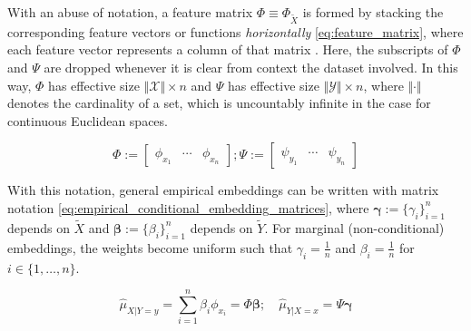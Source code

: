 \documentclass[twoside]{article} \usepackage{aistats2017}
\theoremstyle{definition}
\theoremstyle{theorem}
\newcommand{\rv}[1]{{#1}}
\newcommand{\ds}[1]{\tilde{#1}}
\newcommand{\hatmuYx}{\hat{\mu}_{\rv{Y} | \rv{X} = x}}
\newcommand{\hatmuXy}{\hat{\mu}_{\rv{X} | \rv{Y} = y}}
\newcommand{\cardX}{\Vert \mathcal{X} \Vert}
\newcommand{\cardY}{\Vert \mathcal{Y} \Vert}
\begin{document}
%			
%			
%			
			With an abuse of notation, a feature matrix $\Phi \equiv \Phi_{\ds{X}}$ is formed by stacking the corresponding feature vectors or functions \textit{horizontally} \eqref{eq:feature_matrix}, where each feature vector represents a column of that matrix  \citep{muandet2016kernel}. Here, the subscripts of $\Phi$ and $\Psi$ are dropped whenever it is clear from context the dataset involved. In this way, $\Phi$ has effective size $\cardX \times n$ and $\Psi$ has effective size $\cardY \times n$, where $\Vert \cdot \Vert$ denotes the cardinality of a set, which is uncountably infinite in the case for continuous Euclidean spaces.
				
			\begin{equation}
				\Phi := \begin{bmatrix} \phi_{x_{1}} & \cdots & \phi_{x_{n}} \end{bmatrix}; \Psi := \begin{bmatrix} \psi_{y_{1}} & \cdots & \psi_{y_{n}} \end{bmatrix}
			\label{eq:feature_matrix}
			\end{equation}
				

			With this notation, general empirical embeddings can be written with matrix notation \eqref{eq:empirical_conditional_embedding_matrices}, where $\bm{\gamma} := \{\gamma_{i}\}_{i = 1}^{n}$ depends on $\ds{X}$ and $\bm{\beta} := \{\beta_{i}\}_{i = 1}^{n}$ depends on $\ds{Y}$. For marginal (non-conditional) embeddings, the weights become uniform such that $\gamma_{i} = \frac{1}{n}$ and $\beta_{i} = \frac{1}{n}$ for $i \in \{1, \dots, n\}$.
			
			\begin{equation}
				\hatmuXy = \sum_{i = 1}^{n} \beta_{i} \phi_{x_{i}} = \Phi \bm{\beta} ;\quad \hatmuYx = \Psi \bm{\gamma}
			\label{eq:empirical_conditional_embedding_matrices}
			\end{equation}
		
\end{document}
